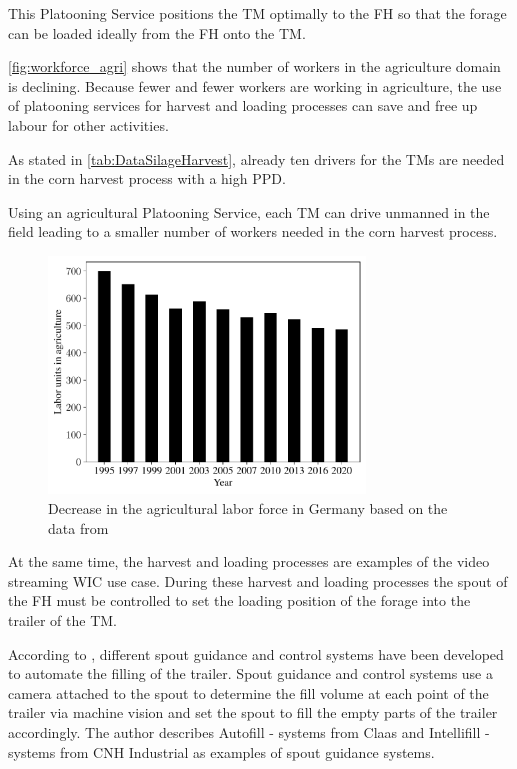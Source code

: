 \documentclass[]{nsm-thesis}
\begin{document}
This Platooning Service positions the \ac{TM} optimally to the \ac{FH} so that the forage can be loaded ideally from the \ac{FH} onto the \ac{TM}.


\autoref{fig:workforce_agri} shows that the number of workers in the agriculture domain is declining.  
Because fewer and fewer workers are working in agriculture, the use of platooning services for harvest and loading processes can save and free up labour for other activities.

As stated in \autoref{tab:DataSilageHarvest}, already ten drivers for the \ac{TM}s are needed in the corn harvest process with a high \ac{PPD}. 

Using an agricultural Platooning Service, each \ac{TM} can drive unmanned in the field leading to a smaller number of workers needed in the corn harvest process.

\begin{figure}%
	\centering
	\includegraphics[width=0.75\textwidth]{figures/WorkForceAgriculture.pdf}
	\caption{Decrease in the agricultural labor force in Germany based on the data from \cite{bmel2020}}%
	\label{fig:workforce_agri}%
\end{figure}


At the same time, the harvest and loading processes are examples of the video streaming \ac{WIC} use case. During these harvest and loading processes the spout of the \ac{FH} must be controlled to set the loading position of the forage into the trailer of the \ac{TM}.

According to \textcite{murcia_quadrotor_2014}, different spout guidance and control systems have been developed to automate the filling of the trailer. Spout guidance and control systems use a camera attached to the spout to determine the fill volume at each point of the trailer via machine vision and set the spout to fill the empty parts of the trailer accordingly. The author describes Autofill - systems from Claas and Intellifill - systems from CNH Industrial as examples of spout guidance systems. 
\end{document}
